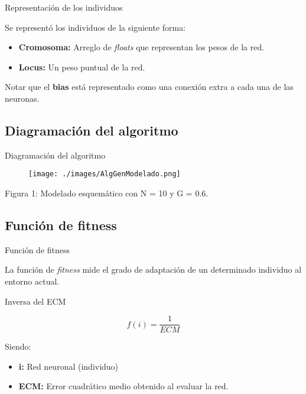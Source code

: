 \documentclass{beamer}
\begin{document}
\begin{frame}{Representación de los individuos}
\par Se representó los individuos de la siguiente forma: \\
\begin{itemize}
\item \textbf{Cromosoma:} Arreglo de \textit{floats} que representan los pesos de la red.
\item \textbf{Locus:} Un peso puntual de la red.
\end{itemize}

\par Notar que el \textbf{bias} está representado como una conexión extra a cada una de las neuronas.
\end{frame}

\subsection{Diagramación del algoritmo}

\begin{frame}{Diagramación del algoritmo}
\begin{figure}[H]
\begin{center}
\texttt{[image: ./images/AlgGenModelado.png]}
\label{modelado}
\end{center}
\end{figure}

\begin{center}
\par Figura 1: Modelado esquemático con N = 10 y G = 0.6.
\end{center}
\end{frame}

\subsection{Función de fitness}


\begin{frame}{Función de fitness}


\par La función de \textit{fitness} mide el grado de adaptación de un determinado individuo al entorno actual.

\begin{block}{Inversa del ECM}

\[
   f(i) = \frac{1}{ECM}
\]

Siendo:

\begin{itemize}
\item \textbf{i:} Red neuronal (individuo)
\item \textbf{ECM:} Error cuadrático medio obtenido al evaluar la red.
\end{itemize}
\end{block}


\end{frame}
\end{document}
